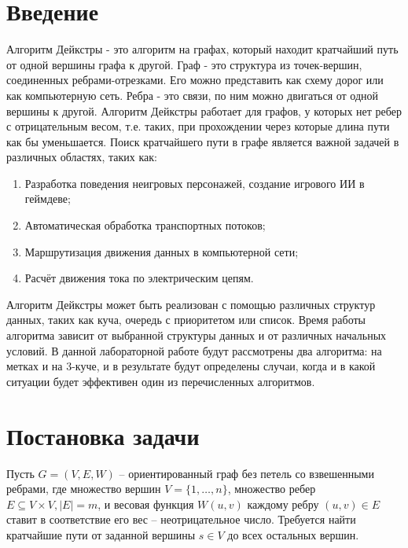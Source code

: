 \graphicspath{ {pictures} }
\begin{text}

\section{Введение}

	Алгоритм Дейкстры - это алгоритм на графах, который находит кратчайший путь от одной вершины графа к другой. Граф - это структура из точек-вершин, соединенных ребрами-отрезками. Его можно представить как схему дорог или как компьютерную сеть. Ребра - это связи, по ним можно двигаться от одной вершины к другой. Алгоритм Дейкстры работает для графов, у которых нет ребер с отрицательным весом, т.е. таких, при прохождении через которые длина пути как бы уменьшается. Поиск кратчайшего пути в графе является важной задачей в различных областях, таких как:
	\begin{enumerate}
	\item Разработка поведения неигровых персонажей, создание игрового ИИ в геймдеве;
	\item Автоматическая обработка транспортных потоков;
	\item Маршрутизация движения данных в компьютерной сети;
	\item Расчёт движения тока по электрическим цепям.
	\end{enumerate} 
	
\vspace{0.5mm}

	Алгоритм Дейкстры может быть реализован с помощью различных структур данных, таких как куча, очередь с приоритетом или список. Время работы алгоритма зависит от выбранной структуры данных и от различных начальных условий. В данной лабораторной работе будут рассмотрены два алгоритма: на метках и на 3-куче, и в результате будут определены случаи, когда и в какой ситуации будет эффективен один из перечисленных алгоритмов.
\newpage

\section{Постановка задачи}

	Пусть $G = (V, E, W)$ -- ориентированный граф без петель со взвешенными ребрами, где множество вершин $V = \{1,\ldots, n\} $, множество ребер $E \subseteq V\times V, \left| E \right| = m$, и весовая функция $W(u,v)$ каждому ребру $(u, v) \in E$ ставит в соответствие  его вес -- неотрицательное число. Требуется найти кратчайшие пути от заданной вершины $s \in V$ до всех остальных вершин. \\
	

\end{text}
